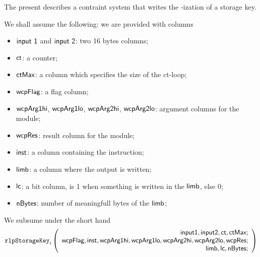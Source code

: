 The present describes a contraint system that writes the \rlp{}-ization of a storage key.

We shall assume the following: we are provided with columns
\begin{itemize}
    \item $\textsf{input 1}$ and $\textsf{input 2}$: two 16 bytes columns;
    \item $\textsf{ct}$: a counter;
    \item $\textsf{ctMax}$: a column which specifies the size of the ct-loop;
    \item $\textsf{wcpFlag}$: a flag column;
    \item $\textsf{wcpArg1hi}$, $\textsf{wcpArg1lo}$, $\textsf{wcpArg2hi}$, $\textsf{wcpArg2lo}$: argument columns for the \wcpMod{} module;
    \item $\textsf{wcpRes}$: result column for the \wcpMod{} module;
    \item $\textsf{inst}$: a column containing the instruction;
    \item $\textsf{limb}$: a column where the output is written;
    \item $\textsf{lc}$: a bit column, is 1 when something is written in the $\textsf{limb}$, else 0;
    \item $\textsf{nBytes}$: number of meaningfull bytes of the $\textsf{limb}$;
\end{itemize}

\noindent We subsume under the short hand
\[
    \texttt{rlpStorageKey}_{i}
    \left(
	\begin{array}{r}
    \textsf{input1},
    \textsf{input2},
    \textsf{ct},
    \textsf{ctMax}; \\
    \textsf{wcpFlag},
    \textsf{inst},
    \textsf{wcpArg1hi},
    \textsf{wcpArg1lo},
    \textsf{wcpArg2hi},
    \textsf{wcpArg2lo},
    \textsf{wcpRes}; \\
    \textsf{limb},
    \textsf{lc},
    \textsf{nBytes}; \\
    \end{array}
	\right)
\]

